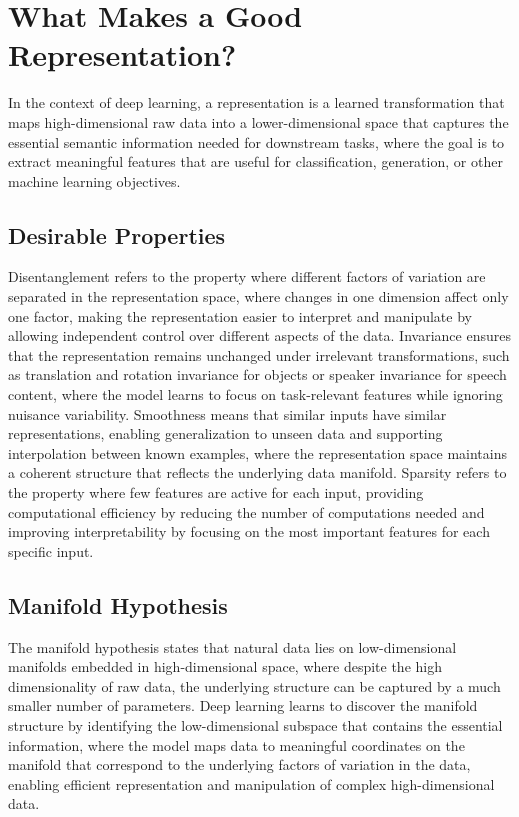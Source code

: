 
\section{What Makes a Good Representation? }
\label{sec:good-representations}

In the context of deep learning, a representation is a learned transformation that maps high-dimensional raw data into a lower-dimensional space that captures the essential semantic information needed for downstream tasks, where the goal is to extract meaningful features that are useful for classification, generation, or other machine learning objectives.

\subsection{Desirable Properties}

Disentanglement refers to the property where different factors of variation are separated in the representation space, where changes in one dimension affect only one factor, making the representation easier to interpret and manipulate by allowing independent control over different aspects of the data. Invariance ensures that the representation remains unchanged under irrelevant transformations, such as translation and rotation invariance for objects or speaker invariance for speech content, where the model learns to focus on task-relevant features while ignoring nuisance variability. Smoothness means that similar inputs have similar representations, enabling generalization to unseen data and supporting interpolation between known examples, where the representation space maintains a coherent structure that reflects the underlying data manifold. Sparsity refers to the property where few features are active for each input, providing computational efficiency by reducing the number of computations needed and improving interpretability by focusing on the most important features for each specific input.

\subsection{Manifold Hypothesis}

The manifold hypothesis states that natural data lies on low-dimensional manifolds embedded in high-dimensional space, where despite the high dimensionality of raw data, the underlying structure can be captured by a much smaller number of parameters. Deep learning learns to discover the manifold structure by identifying the low-dimensional subspace that contains the essential information, where the model maps data to meaningful coordinates on the manifold that correspond to the underlying factors of variation in the data, enabling efficient representation and manipulation of complex high-dimensional data.

